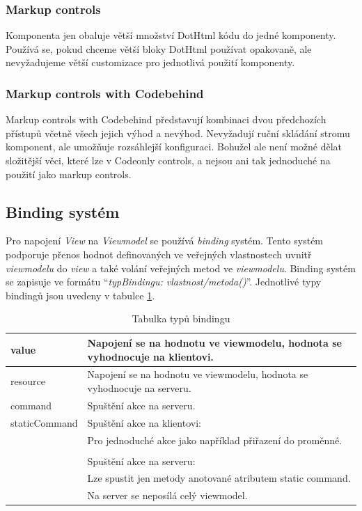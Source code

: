 \subsubsection{Markup controls}
 Komponenta jen obaluje větší množství DotHtml kódu do jedné komponenty.\newline
 Používá se, pokud chceme větší bloky DotHtml používat opakovaně, ale nevyžadujeme větší customizace pro jednotlivá použití komponenty.
 
 \subsubsection{Markup controls with Codebehind}
 Markup controls with Codebehind představují kombinaci dvou předchozích přístupů včetně všech jejich výhod a nevýhod. Nevyžadují ruční skládání stromu komponent, ale umožňuje rozsáhlejší konfiguraci. Bohužel ale není možné dělat složitější věci, které lze v Codeonly controls, a nejsou ani tak jednoduché na použití jako markup controls.
 
\subsection*{Binding systém}
\label{DotVVMBinding}
Pro napojení \emph{View} na \emph{Viewmodel} se používá \emph{binding} systém. Tento systém podporuje přenos hodnot definovaných ve veřejných vlastnostech uvnitř \emph{viewmodelu} do \emph{view} a také volání veřejných metod ve \emph{viewmodelu}.
Binding systém se zapisuje ve formátu “\emph{{typBindingu: vlastnost/metoda()}}”\cite{DotVVM-Binding}. Jednotlivé typy bindingů jsou uvedeny v tabulce \ref{tab: Tabulka typů bindingu}.

\begin{table}[H]
	\caption{Tabulka typů bindingu} 
	\centering
	\begin{tabular}{m{8em}|m{30em}}
		\toprule
		value & Napojení se na hodnotu ve viewmodelu, hodnota se vyhodnocuje na klientovi.\\ \midrule
		resource & Napojení se na hodnotu ve viewmodelu, hodnota se vyhodnocuje na serveru.\\ \midrule
		command & Spuštění akce na serveru.\\ \midrule
		staticCommand & Spuštění akce na klientovi: \\
		& Pro jednoduché akce jako například přiřazení do proměnné. \\\\
		& Spuštění akce na serveru: \\
		& Lze spustit jen metody anotované atributem static command. \\
		& Na server se neposílá celý viewmodel. \\

		\bottomrule
	\end{tabular}
	\label{tab: Tabulka typů bindingu}
\end{table}

